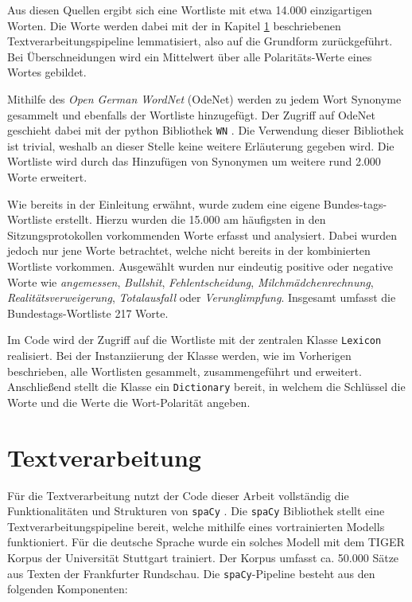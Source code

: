 Aus diesen Quellen ergibt sich eine Wortliste mit etwa 14.000 einzigartigen Worten. 
Die Worte werden dabei mit der in Kapitel \ref{g3textv} beschriebenen Textverarbeitungspipeline lemmatisiert, also auf die Grundform zurückgeführt. 
Bei Überschneidungen wird ein Mittelwert über alle Polaritäts-Werte eines Wortes gebildet. 

Mithilfe des \textit{Open German WordNet} (OdeNet) \cite{g3_odenet} werden zu jedem Wort Synonyme gesammelt und ebenfalls der Wortliste hinzugefügt. 
Der Zugriff auf OdeNet geschieht dabei mit der python Bibliothek \texttt{WN} \cite{g3_wn}. 
Die Verwendung dieser Bibliothek ist trivial, weshalb an dieser Stelle keine weitere Erläuterung gegeben wird. 
Die Wortliste wird durch das Hinzufügen von Synonymen um weitere rund 2.000 Worte erweitert. 

Wie bereits in der Einleitung erwähnt, wurde zudem eine eigene Bundes-tags-Wortliste erstellt. 
Hierzu wurden die 15.000 am häufigsten in den Sitzungsprotokollen vorkommenden Worte erfasst und analysiert. 
Dabei wurden jedoch nur jene Worte betrachtet, welche nicht bereits in der kombinierten Wortliste vorkommen. 
Ausgewählt wurden nur eindeutig positive oder negative Worte wie \textit{angemessen}, \textit{Bullshit}, \textit{Fehlentscheidung}, \textit{Milchmädchenrechnung}, \textit{Realitätsverweigerung}, \textit{Totalausfall} oder \textit{Verunglimpfung}. 
Insgesamt umfasst die Bundestags-Wortliste 217 Worte. 

Im Code wird der Zugriff auf die Wortliste mit der zentralen Klasse \texttt{Lexicon} realisiert. 
Bei der Instanziierung der Klasse werden, wie im Vorherigen beschrieben, alle Wortlisten gesammelt, zusammengeführt und erweitert. 
Anschließend stellt die Klasse ein \texttt{Dictionary} bereit, in welchem die Schlüssel die Worte und die Werte die Wort-Polarität angeben. 

\section{Textverarbeitung}
\label{g3textv}
Für die Textverarbeitung nutzt der Code dieser Arbeit vollständig die Funktionalitäten und Strukturen von \texttt{spaCy} \cite{g3_spacy}. 
Die \texttt{spaCy} Bibliothek stellt eine Textverarbeitungspipeline bereit, welche mithilfe eines vortrainierten Modells funktioniert. 
Für die deutsche Sprache wurde ein solches Modell mit dem TIGER Korpus der Universität Stuttgart trainiert. 
Der Korpus umfasst ca. 50.000 Sätze aus Texten der Frankfurter Rundschau. 
Die \texttt{spaCy}-Pipeline besteht aus den folgenden Komponenten: 

